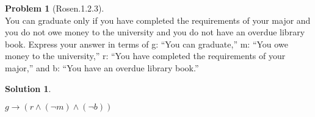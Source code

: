 \documentclass{article}
\theoremstyle{definition}
\newtheorem*{problem}{Problem}
\newtheorem*{solution}{Solution}
\begin{document}
\begin{problem}[Rosen.1.2.3]\ \\
You can graduate only if you have completed the requirements
of your major and you do not owe money to the
university and you do not have an overdue library book.
Express your answer in terms of g: “You can graduate,”
m: “You owe money to the university,” r: “You have completed
the requirements of your major,” and b: “You have
an overdue library book.”
\begin{compactenum}
\renewcommand{\theenumi}{\alph{enumi}}

\end{compactenum}
\end{problem}

\begin{solution}\ \\
\begin{compactenum}
\renewcommand{\theenumi}{\alph{enumi}}
$g \rightarrow (r \wedge (\neg m) \wedge (\neg b))$
\end{compactenum}
\end{solution}
\end{document}
